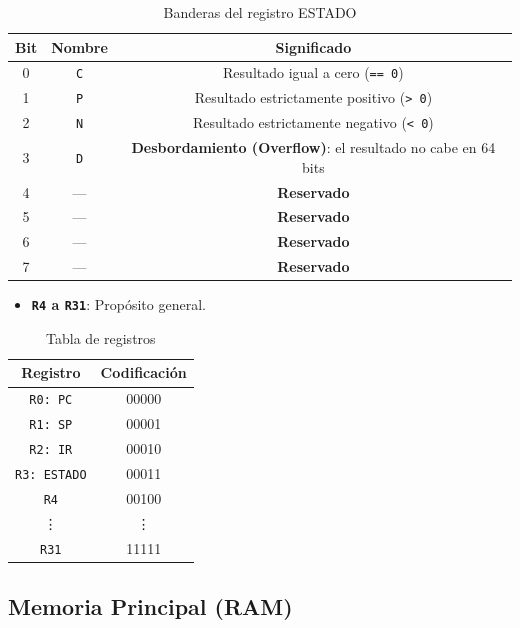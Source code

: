 \documentclass{article}
\begin{document}
\begin{table}[H]
    \centering
    \begin{tabular}{|c|c|c|}
    \hline
    \textbf{Bit} & \textbf{Nombre} & \textbf{Significado} \\
    \hline
    0 & \texttt{C} & Resultado igual a cero (\texttt{== 0}) \\
    1 & \texttt{P} & Resultado estrictamente positivo (\texttt{> 0}) \\
    2 & \texttt{N} & Resultado estrictamente negativo (\texttt{< 0}) \\
    3 & \texttt{D} & \textbf{Desbordamiento (Overflow)}: el resultado no cabe en 64 bits \\
    4 & — & \textbf{Reservado} \\
    5 & — & \textbf{Reservado} \\
    6 & — & \textbf{Reservado} \\
    7 & — & \textbf{Reservado} \\
    \hline
    \end{tabular}
    \caption{Banderas del registro ESTADO}
\end{table}

\begin{itemize}
    \item \textbf{\texttt{R4} a \texttt{R31}}: Propósito general.
\end{itemize}

\begin{table}[H]
    \centering
    \begin{tabular}{|c|c|}
    \hline
    \textbf{Registro} & \textbf{Codificación} \\
    \hline
    \texttt{R0: PC} & 00000 \\
    \texttt{R1: SP} & 00001 \\
    \texttt{R2: IR} & 00010 \\
    \texttt{R3: ESTADO} & 00011 \\
    \texttt{R4} & 00100 \\
    \vdots & \vdots \\
    \texttt{R31} & 11111 \\
    \hline
    \end{tabular}
    \caption{Tabla de registros}
\end{table}

\subsection{Memoria Principal (RAM)}
\end{document}
